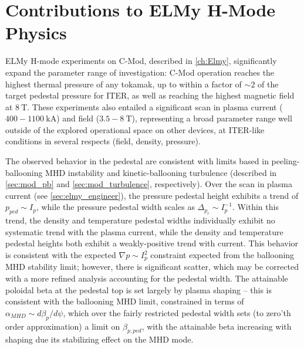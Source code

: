 \section{Contributions to ELMy H-Mode Physics}\label{sec:conc_elmy}

ELMy H-mode experiments on C-Mod, described in \cref{ch:Elmy}, significantly expand the parameter range of investigation: C-Mod operation reaches the highest thermal pressure of any tokamak, up to within a factor of $\sim 2$ of the target pedestal pressure for ITER, as well as reaching the highest magnetic field at $\SI{8}{\tesla}$.  These experiments also entailed a significant scan in plasma current ($400-\SI{1100}{\kilo\ampere}$) and field ($3.5-\SI{8}{\tesla}$), representing a broad parameter range well outside of the explored operational space on other devices, at ITER-like conditions in several respects (\eg field, density, pressure).


The observed behavior in the pedestal are consistent with limits based in peeling-ballooning MHD instability and kinetic-ballooning turbulence (described in \cref{sec:mod_pb} and \cref{sec:mod_turbulence}, respectively).  Over the scan in plasma current (see \cref{sec:elmy_engineer}), the pressure pedestal height exhibits a trend of $p_{ped} \sim I_p$, while the pressure pedestal width scales as $\Delta_{p_e} \sim I_p^{-1}$.  Within this trend, the density and temperature pedestal widths individually exhibit no systematic trend with the plasma current, while the density and temperature pedestal heights both exhibit a weakly-positive trend with current.  This behavior is consistent with the expected $\nabla p \sim I_p^2$ constraint expected from the ballooning MHD stability limit; however, there is significant scatter, which may be corrected with a more refined analysis accounting for the pedestal width.  The attainable poloidal beta at the pedestal top is set largely by plasma shaping -- this is consistent with the ballooning MHD limit, constrained in terms of $\alpha_{MHD} \sim d\beta_{p}/d\psi$, which over the fairly restricted pedestal width sets (to zero'th order approximation) a limit on $\beta_{p,ped}$, with the attainable beta increasing with shaping due its stabilizing effect on the MHD mode.

